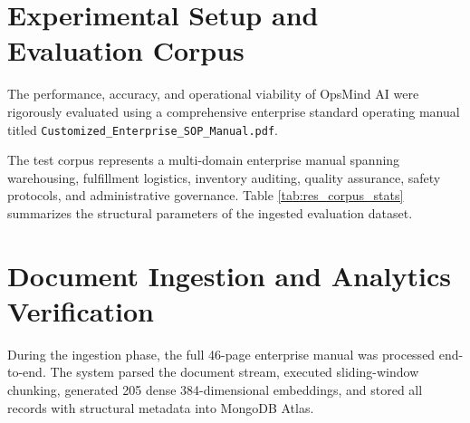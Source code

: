 \section{Experimental Setup and Evaluation Corpus}
\label{sec:res_corpus}

The performance, accuracy, and operational viability of OpsMind AI were rigorously evaluated using a comprehensive enterprise standard operating manual titled \texttt{Customized\_Enterprise\_SOP\_Manual.pdf}. 

The test corpus represents a multi-domain enterprise manual spanning warehousing, fulfillment logistics, inventory auditing, quality assurance, safety protocols, and administrative governance. Table \ref{tab:res_corpus_stats} summarizes the structural parameters of the ingested evaluation dataset.

\begin{table}[H]
\centering
\caption{Structural Metrics of the Evaluation SOP Corpus}
\label{tab:res_corpus_stats}
\end{table}

\section{Document Ingestion and Analytics Verification}
\label{sec:res_ingestion_eval}

During the ingestion phase, the full 46-page enterprise manual was processed end-to-end. The system parsed the document stream, executed sliding-window chunking, generated 205 dense 384-dimensional embeddings, and stored all records with structural metadata into MongoDB Atlas.

